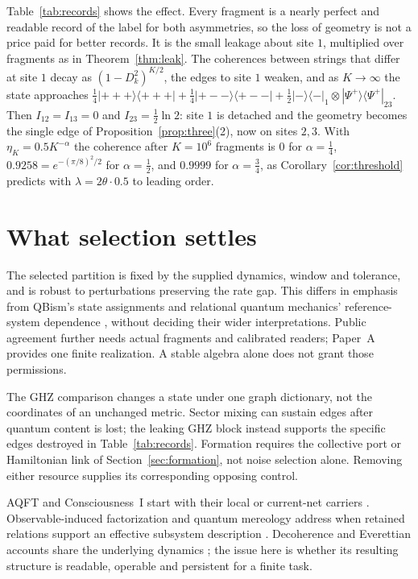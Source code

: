 \documentclass[12pt,a4paper]{article}
\newcommand{\proj}[1]{|#1\rangle\!\langle #1|}
\begin{document}
Table~\ref{tab:records} shows the effect. Every fragment is a nearly perfect and readable record of the label for both asymmetries, so the loss of geometry is not a price paid for better records. It is the small leakage about site $1$, multiplied over fragments as in Theorem~\ref{thm:leak}. The coherences between strings that differ at site $1$ decay as $(1-D_k^2)^{K/2}$, the edges to site $1$ weaken, and as $K\to\infty$ the state approaches $\frac14\proj{+++}+\frac14\proj{+--}+\frac12\proj{-}_1\otimes\proj{\Psi^+}_{23}$. Then $I_{12}=I_{13}=0$ and $I_{23}=\frac12\ln2$: site $1$ is detached and the geometry becomes the single edge of Proposition~\ref{prop:three}(2), now on sites $2,3$. With $\eta_K=0.5K^{-\alpha}$ the coherence after $K=10^6$ fragments is $0$ for $\alpha=\frac14$, $0.9258=e^{-(\pi/8)^2/2}$ for $\alpha=\frac12$, and $0.9999$ for $\alpha=\frac34$, as Corollary~\ref{cor:threshold} predicts with $\lambda=2\theta\cdot0.5$ to leading order.

\section{What selection settles}
\label{sec:meaning}

The selected partition is fixed by the supplied dynamics, window and
tolerance, and is robust to perturbations preserving the rate gap.
This differs in emphasis from QBism's state assignments and relational
quantum mechanics' reference-system dependence
\cite{Fuchs2014,Rovelli1996}, without deciding their wider interpretations.
Public agreement further needs actual fragments and calibrated readers;
Paper~A provides one finite realization. A stable algebra alone does not
grant those permissions.

The GHZ comparison changes a state under one graph dictionary, not the
coordinates of an unchanged metric. Sector mixing can sustain edges
after quantum content is lost; the leaking GHZ block instead supports
the specific edges destroyed in Table~\ref{tab:records}. Formation
requires the collective port or Hamiltonian link of
Section~\ref{sec:formation}, not noise selection alone.
Removing either resource supplies its corresponding opposing control.

AQFT and Consciousness~I start with their local or current-net carriers
\cite{Haag1996,PaperCI}. Observable-induced factorization and quantum
mereology address when retained relations support an effective subsystem
description \cite{Zanardi2004,Cotler2019,CarrollSingh2021}. Decoherence and
Everettian accounts share the underlying dynamics
\cite{Zurek2003,Wallace2012}; the issue here is whether its resulting
structure is readable, operable and persistent for a finite task.
\end{document}
